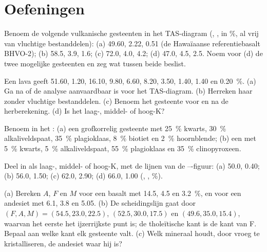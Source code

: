 \section{Oefeningen}

\begin{exercise}[$\star$]\label{exo:b2:magmatic-series:1}
Benoem de volgende vulkanische gesteenten in het TAS-diagram (, , 
in \unit{\percent}, al vrij van vluchtige bestanddelen): (a) 49.60, 2.22, 0.51 (de Hawaïaanse
referentiebasalt BHVO-2); (b) 58.5, 3.9, 1.6; (c) 72.0, 4.0, 4.2; (d) 47.0, 4.5, 2.5.
Noem voor (d) de twee mogelijke gesteenten en zeg wat tussen beide beslist.
\end{exercise}

\begin{exercise}[$\star$]\label{exo:b2:magmatic-series:2}
Een lava geeft  51.60,  1.20,  16.10,  9.80,
 6.60,  8.20,  3.50,  1.40,  1.40 en
 \qty{0.20}{\percent}. (a) Ga na of de analyse aanvaardbaar is voor het TAS-diagram.
(b) Herreken haar zonder vluchtige bestanddelen. (c) Benoem het gesteente voor en na de
herberekening. (d) Is het laag-, middel- of hoog-K?
\end{exercise}

\begin{exercise}[$\star$]\label{exo:b2:magmatic-series:3}
Benoem in het : (a) een grofkorrelig gesteente met \qty{25}{\percent} kwarts,
\qty{30}{\percent} alkaliveldspaat, \qty{35}{\percent} plagioklaas, \qty{8}{\percent}
biotiet en \qty{2}{\percent} hoornblende; (b) een met \qty{5}{\percent} kwarts,
\qty{5}{\percent} alkaliveldspaat, \qty{55}{\percent} plagioklaas en
\qty{35}{\percent} clinopyroxeen.
\end{exercise}

\begin{exercise}[$\star$]\label{exo:b2:magmatic-series:4}
Deel in als laag-, middel- of hoog-K, met de lijnen van de ---figuur:
(a) 50.0, 0.40; (b) 56.0, 1.50; (c) 62.0, 2.90; (d) 66.0, 1.00 (,
, \unit{\percent}).
\end{exercise}

\begin{exercise}[$\star\star$]\label{exo:b2:magmatic-series:5}
(a) Bereken $A$, $F$ en $M$ voor een basalt met  14.5,  4.5 en
 \qty{3.2}{\percent}, en voor een andesiet met 6.1, 3.8 en 5.05.
(b) De scheidingslijn gaat door $(F, A, M) = (54.5, 23.0, 22.5)$, $(52.5, 30.0,
17.5)$ en $(49.6, 35.0, 15.4)$, waarvan het eerste het ijzerrijkste punt is; de
tholeïtische kant is de kant van F. Bepaal aan welke kant elk gesteente valt. (c) Welk
mineraal houdt, door vroeg te kristalliseren, de andesiet waar hij is?
\end{exercise}

